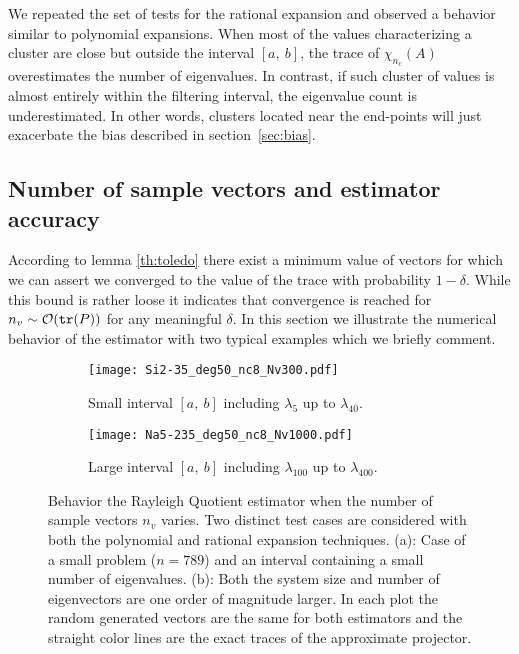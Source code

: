 \documentclass[12pt]{article}		\usepackage{tabls,multirow}
\def\trace{\mbox{\tt tr}}
\newcommand{\ab}{[a, \ b]}
\begin{document}
We repeated the set of tests for the rational expansion and observed a
behavior similar to polynomial expansions. When most of the values
characterizing a cluster are close but outside the interval $\ab$,
the trace of $\chi_{n_c}(A)$ overestimates the number of
eigenvalues. In contrast, if such cluster of values is almost entirely
within the filtering interval, the eigenvalue count is underestimated.
In other words, clusters located near the end-points will just
exacerbate the bias described in section~\ref{sec:bias}.



\subsection{Number of sample vectors and estimator accuracy}
\label{sec:vectrace}
According to lemma \ref{th:toledo} there exist a minimum value
of vectors for which we can assert we converged to the value of the
trace with probability $1-\delta$. While this bound is rather loose it
indicates that convergence is reached for $n_v \sim
\mathcal{O}({\trace(P)})$ for any meaningful $\delta$. In this section we
illustrate the numerical behavior of the estimator with two typical
examples which we briefly comment.
\begin{figure}[!hbt]
\centering
  \begin{subfigure}[b]{0.495\textwidth}
                \centering
                \texttt{[image: Si2-35\_deg50\_nc8\_Nv300.pdf]}
                \caption{Small interval $\ab$ including $\lambda_5$ 
                    up to $\lambda_{40}$.}
                \label{fig:intrv1}
  \end{subfigure}
  \begin{subfigure}[b]{0.495\textwidth}
                \centering
                \texttt{[image: Na5-235\_deg50\_nc8\_Nv1000.pdf]}
                \caption{Large interval $\ab$ including $\lambda_{100}$ up to
                    $\lambda_{400}$.}
                \label{fig:intrv2}
  \end{subfigure}
  \caption{Behavior the Rayleigh Quotient estimator when
     the number of sample vectors $n_v$ varies. Two distinct test cases
 are considered with 
 both the polynomial and rational expansion techniques.
 (a):  Case of a small problem
 ($n=789$) and an interval containing a small number of
  eigenvalues.   (b): Both the system size and number of
  eigenvectors are one order of magnitude larger. In each plot the
  random generated vectors are the same for both estimators and the
  straight color lines are the exact traces of the approximate
  projector.}
  \label{fig:estvsNv}
\end{figure}
\end{document}
